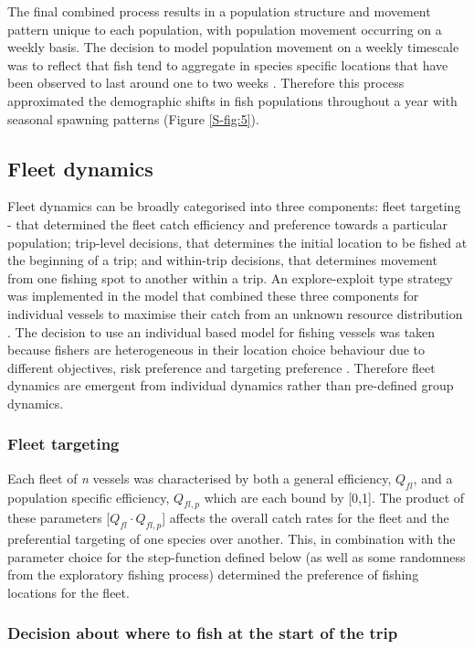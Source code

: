 \documentclass[review]{elsarticle}
\begin{document}
The final combined process results in a population structure and movement
pattern unique to each population, with population movement occurring on a weekly
basis. The decision to model population movement on a weekly timescale was to
reflect that fish tend to aggregate in species specific locations that have
been observed to last around one to two weeks \citep{Poos2007}. Therefore this
process approximated the demographic shifts in fish populations throughout a
year with seasonal spawning patterns (Figure \ref{S-fig:5}).

\subsection{Fleet dynamics}

Fleet dynamics can be broadly categorised into three components: fleet
targeting - that determined the fleet catch efficiency and preference towards a
particular population; trip-level decisions, that determines the initial location
to be fished at the beginning of a trip; and within-trip decisions, that
determines movement from one fishing spot to another within a trip. An
explore-exploit type strategy was implemented in the model that combined these
three components for individual vessels to maximise their catch from an unknown
resource distribution \citep{Bailey2018}. The decision to use an individual
based model for fishing vessels was taken because fishers are heterogeneous in
their location choice behaviour due to different objectives, risk preference
and targeting preference \citep{VanPutten2012a, Boonstra2015}. Therefore fleet
dynamics are emergent from individual dynamics rather than pre-defined group
dynamics. 

\subsubsection{Fleet targeting}

Each fleet of \textit{n} vessels was characterised by both a general
efficiency, $Q_{fl}$, and a population specific efficiency, ${Q_{fl, p}}$ which
are each bound by [0,1]. The product of these parameters [$Q_{fl} \cdot
Q_{fl, p}$] affects the overall catch rates for the fleet and the preferential
targeting of one species over another. This, in combination with the
parameter choice for the step-function defined below (as well as some
randomness from the exploratory fishing process) determined the preference of
fishing locations for the fleet.  

\subsubsection{Decision about where to fish at the start of the trip}
\end{document}
